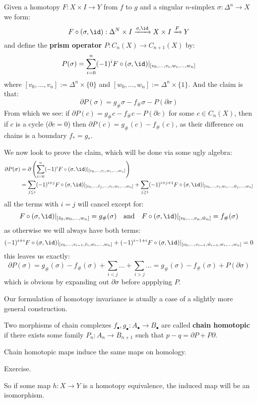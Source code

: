 \documentclass[a4paper]{article}
\begin{document}
\begin{theorem}
\begin{prf}
Given a homotopy $F:X\times I\rightarrow Y$ from $f$ to $g$ and a singular $n$-simplex $\sigma:\Delta^n\rightarrow X$ we form:\[
    F\circ(\sigma,\id):\Delta^N\times I \xrightarrow{\sigma,\id} X\times I \xrightarrow{F} Y
\]
and define the \textbf{prism operator} $P:C_n(X)\rightarrow C_{n+1}(X)$ by:\[
    P(\sigma)=\sum_{i=0}^n (-1)^i F\circ(\sigma,\id)\vert_{[v_0,\ldots,v_i,w_i,\ldots,w_n]}
\]
where $[v_0,\ldots,v_n]:= \Delta^n\times\{0\}$ and $[w_0,\ldots,w_n]:= \Delta^n\times\{1\}$.
And the claim is that: \[
    \partial P(\sigma) = g_\#\sigma-f_\#\sigma-P(\partial\sigma)
\]
From which we see: if $\partial P(c) = g_\#c-f_\#c-P(\partial c)$ for some $c\in C_n(X)$, then if $c$ is a cycle ($\partial c=0$) then $\partial P(c) = g_\#(c)-f_\#(c)$, as their difference on chains is a boundary $f_*=g_*$.

We now look to prove the claim, which will be done via some ugly algebra:\begin{align*}
    \partial P(\sigma) &= \partial\pr{\sum_{i=0}^n (-1)^i F\circ(\sigma,\id)\vert_{[v_0,\ldots,v_i,w_i,\ldots,w_n]}} \\
    &= \sum_{j\leq i} (-1)^{i+j } F\circ(\sigma,\id)\vert_{[v_0,\ldots,\hat{v}_j,\ldots,v_i,w_i,\ldots,w_n]} + 
    \sum_{j\geq i} (-1)^{i+j+1} F\circ(\sigma,\id)\vert_{[v_0,\ldots,v_i,w_i,\ldots,\hat{w}_j,\ldots,w_n]}
\end{align*}
all the terms with $i=j$ will cancel except for:\[
    F\circ(\sigma,\id)\vert_{[\hat{v}_0,w_0,\ldots,w_n]} =g_\#(\sigma)
    \quad \text{and} \quad 
    F\circ(\sigma,\id)\vert_{[v_0,\ldots,v_n,\hat{w}_n]} = f_\#(\sigma)
\]
as otherwise we will always have both terms:\[
    (-1)^{i+i}F\circ(\sigma,\id)\vert_{[v_0,\ldots,v_{i-1},\hat{v}_i,w_i,\ldots,w_n]} + 
    (-1)^{i-1+i}F\circ(\sigma,\id)\vert_{[v_0,\ldots,v_{i-1},\hat{w}_{i-1},w_i,\ldots,w_n]} = 0
\]
this leaves us exactly:\[
    \partial P(\sigma) = g_\#(\sigma) - f_\#(\sigma) + \sum_{i<j}\ldots + \sum_{i>j}\ldots = g_\#(\sigma)-f_\#(\sigma) + P(\partial \sigma)
\]
which is obvious by expanding out $\partial \sigma$ before appplying $P$.
\end{prf}
\end{theorem}
Our formulation of homotopy invariance is atually a case of a slightly more general construction.
\begin{definition}
    Two morphisms of chain complexes $f_\bullet,g_\bullet:A_\bullet\rightarrow B_\bullet$ are called \textbf{chain homotopic} if there exists some family $P_n:A_n\rightarrow B_{n+1}$ such that $p-q = \partial P + P\partial$. %
\end{definition}
\begin{proposition}
    Chain homotopic maps induce the same maps on homology.
    \begin{prf}
        Exercise.
    \end{prf}
\end{proposition}
So if some map $h:X\rightarrow Y$ is a homotopy equivalence, the induced map will be an isomorphism.
\end{document}
